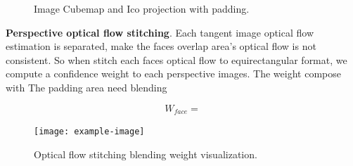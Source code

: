 \begin{figure}[hbt!]
	\begin{center}
	\end{center}
	\caption{\label{fig:approach:projection}
		Image Cubemap and Ico projection with padding. }
\end{figure}

\textbf{Perspective optical flow stitching}.
Each tangent image optical flow estimation is separated, make the faces overlap area's optical flow is not consistent.
So when stitch each faces optical flow to equirectangular format, we compute a confidence weight to each perspective images.
The weight compose with 
The padding area need blending

\begin{equation}
W_{face} =
\end{equation}

\begin{figure}[hbt!]
	\centering
	\texttt{[image: example-image]}
	\caption{Optical flow stitching blending weight visualization.}
	\label{fig:approach:blendweight}
\end{figure}

